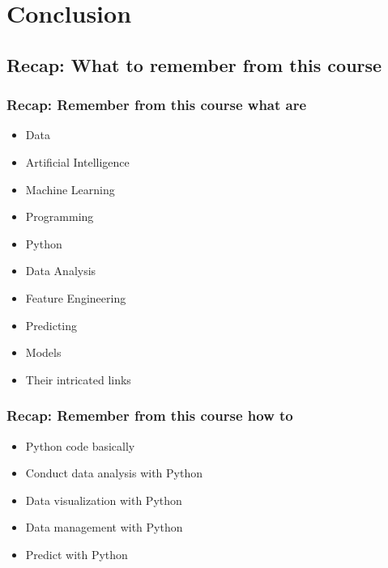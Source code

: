 



\begin{frame}
   \titlepage
\end{frame}



\begin{frame}
   \tableofcontents
\end{frame}

\section{Conclusion}


\subsection{Recap: What to remember from this course}
\begin{frame}\frametitle{Recap: Remember from this course what are}
   \begin{itemize}
      \item Data
      \item Artificial Intelligence
      \item Machine Learning
      \item Programming
      \item Python
      \item Data Analysis
      \item Feature Engineering
      \item Predicting
      \item Models
      \item Their intricated links
   \end{itemize}
\end{frame}

\begin{frame}\frametitle{Recap: Remember from this course how to}
   \begin{itemize}
      \item Python code basically
      \item Conduct data analysis with Python
      \item Data visualization with Python
      \item Data management with Python
      \item Predict with Python
   \end{itemize}
\end{frame}

